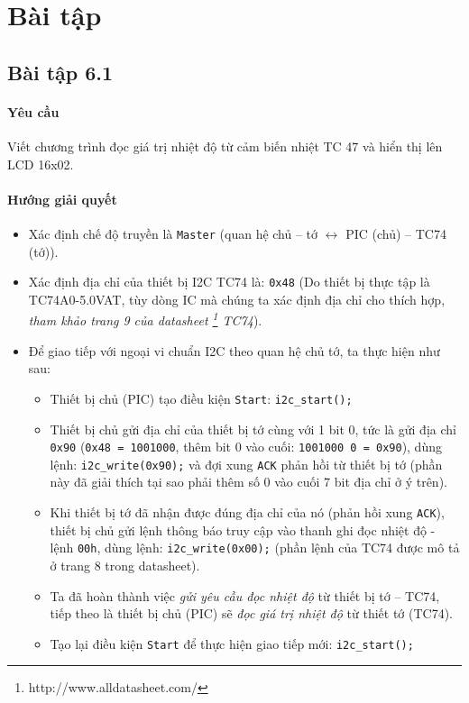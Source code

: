 \section{Bài tập}
\subsection{Bài tập 6.1}\label{Ex:6-1}
\paragraph{Yêu cầu}Viết chương trình đọc giá trị nhiệt độ từ cảm biến nhiệt TC 47 và hiển thị lên LCD 16x02.
\paragraph{Hướng giải quyết}
\begin{itemize}
\item Xác định chế độ truyền là \verb|Master| (quan hệ chủ -- tớ $\longleftrightarrow$ PIC (chủ) -- TC74 (tớ)).
\item Xác định địa chỉ của thiết bị I2C TC74 là: \verb|0x48| (Do thiết bị thực tập là TC74A0-5.0VAT, tùy dòng IC mà chúng ta xác định địa chỉ cho thích hợp, \textit{tham khảo trang 9 của datasheet \footnote{http://www.alldatasheet.com/} TC74}). %
\item Để giao tiếp với ngoại vi chuẩn I2C theo quan hệ chủ tớ, ta thực hiện như sau:
\begin{itemize}
\item Thiết bị chủ (PIC) tạo điều kiện \verb|Start|: \verb|i2c_start();|
\item Thiết bị chủ gửi địa chỉ của thiết bị tớ cùng với 1 bit 0, tức là gửi địa chỉ \verb|0x90| (\verb|0x48 = 1001000|, thêm bit 0 vào cuối: \verb|1001000 0 = 0x90|), dùng lệnh: \verb|i2c_write(0x90);| và đợi xung \verb|ACK| phản hồi từ thiết bị tớ (phần này đã giải thích tại sao phải thêm số 0 vào cuối 7 bit địa chỉ ở ý trên).
\item Khi thiết bị tớ đã nhận được đúng địa chỉ của nó (phản hồi xung \verb|ACK|), thiết bị chủ gửi lệnh thông báo truy cập vào thanh ghi đọc nhiệt độ - lệnh \verb|00h|, dùng lệnh: \verb|i2c_write(0x00);| (phần lệnh của TC74 được mô tả ở trang 8 trong datasheet).
\item Ta đã hoàn thành việc \textit{gửi yêu cầu đọc nhiệt độ} từ thiết bị tớ -- TC74, tiếp theo là thiết bị chủ (PIC) sẽ \textit{đọc giá trị nhiệt độ} từ thiết tớ (TC74).
\item Tạo lại điều kiện \verb|Start| để thực hiện giao tiếp mới: \verb|i2c_start();|

\end{itemize}
\end{itemize}
